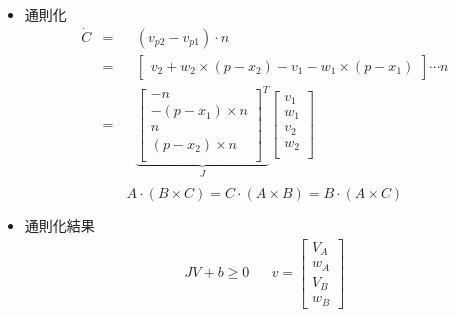 \begin{itemize}
    \item{通則化}
        \begin{equation}
            \begin{aligned}
                \dot{C} &=&& (v_{p2}-v_{p1})\cdot n \\
                        &=&& \begin{bmatrix}v_2+w_2\times(p-x_2)-v_1-w_1\times(p-x_1)\end{bmatrix}\cdots n \\
                        &=&& \underbrace{
                                \begin{bmatrix}
                                    -n \\
                                    -(p-x_1)\times n \\
                                    n \\
                                    (p-x_2)\times n\\
                                \end{bmatrix}^T
                            }_J
                            \begin{bmatrix}
                                v_1 \\
                                w_1 \\
                                v_2 \\
                                w_2 \\
                            \end{bmatrix} \\
            \end{aligned}
        \end{equation}
        \begin{equation}
            A\cdot(B\times C) = C\cdot(A\times B) = B\cdot(A\times C)
        \end{equation}
    \item{通則化結果}
        \begin{equation}
            \begin{aligned}
            JV + b \geq 0 && v = \begin{bmatrix}V_A\\w_A\\V_B\\w_B\end{bmatrix}
            \end{aligned}
        \end{equation}

\end{itemize}
